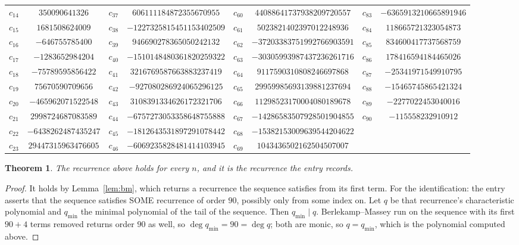 \documentclass[11pt,a4paper]{article}
\theoremstyle{plain}
\newtheorem{theorem}{Theorem}
\theoremstyle{definition}
\begin{document}
\begin{center}
\begin{tabular}{cccccccc}
$c_{14}$ & $350090641326$ & $c_{37}$ & $606111184872355670955$ & $c_{60}$ & $44088641737938209720557$ & $c_{83}$ & $-6365913210665891946$ \\
$c_{15}$ & $1681508624009$ & $c_{38}$ & $-1227325815451153402509$ & $c_{61}$ & $5023821402397012248936$ & $c_{84}$ & $118665721323054873$ \\
$c_{16}$ & $-646755785400$ & $c_{39}$ & $946690278365050242132$ & $c_{62}$ & $-37203383751992766903591$ & $c_{85}$ & $834600417737568759$ \\
$c_{17}$ & $-1283652984204$ & $c_{40}$ & $-1510148480361820259322$ & $c_{63}$ & $-30305993987437236261716$ & $c_{86}$ & $178416594184465026$ \\
$c_{18}$ & $-75789595856422$ & $c_{41}$ & $3216769587663883237419$ & $c_{64}$ & $9117590310808246697868$ & $c_{87}$ & $-25341971549910795$ \\
$c_{19}$ & $75670590709656$ & $c_{42}$ & $-927080286924065296125$ & $c_{65}$ & $29959985693139881237694$ & $c_{88}$ & $-15465745865421324$ \\
$c_{20}$ & $-465962071522548$ & $c_{43}$ & $3108391334626172321706$ & $c_{66}$ & $11298523170004080189678$ & $c_{89}$ & $-2277022453040016$ \\
$c_{21}$ & $2998724687083589$ & $c_{44}$ & $-6757273053358648755888$ & $c_{67}$ & $-14286583507928501904855$ & $c_{90}$ & $-115558232910912$ \\
$c_{22}$ & $-6438262487435247$ & $c_{45}$ & $-1812643531897291078442$ & $c_{68}$ & $-15382153009639544204622$ &  &  \\
$c_{23}$ & $29447315963476605$ & $c_{46}$ & $-6069235828481414103945$ & $c_{69}$ & $1043436502162504507007$ &  &  \\
\end{tabular}
\end{center}

\begin{theorem}
The recurrence above holds for every $n$, and it is the recurrence the entry records.
\end{theorem}

\begin{proof}
It holds by Lemma~\ref{lem:bm}, which returns a recurrence the sequence satisfies from its
first term. For the identification: the entry asserts that the sequence satisfies SOME
recurrence of order $90$, possibly only from some index on. Let $q$ be that recurrence's
characteristic polynomial and $q_{\min}$ the minimal polynomial of the tail of the sequence.
Then $q_{\min}\mid q$. Berlekamp--Massey run on the sequence with its first $90+4$ terms
removed returns order $90$ as well, so $\deg q_{\min}=90=\deg q$; both are monic, so
$q=q_{\min}$, which is the polynomial computed above.
\end{proof}
\end{document}
